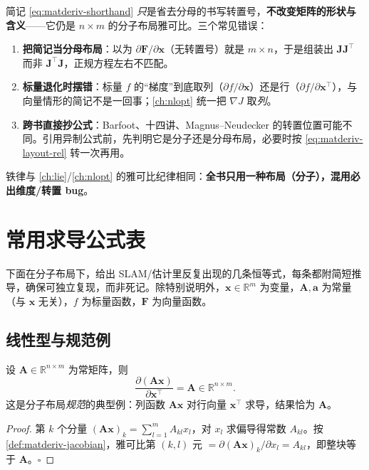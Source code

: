 \begin{pitfall}
简记 \cref{eq:matderiv-shorthand} \emph{只}是省去分母的书写转置号，\textbf{不改变矩阵的形状与含义}——它仍是 $n\times m$ 的分子布局雅可比。三个常见错误：
\begin{enumerate}
  \item \textbf{把简记当分母布局}：以为 $\partial\mathbf{F}/\partial\mathbf{x}$（无转置号）就是 $m\times n$，于是组装出 $\mathbf{J}\mathbf{J}^\top$ 而非 $\mathbf{J}^\top\mathbf{J}$，正规方程左右不匹配。
  \item \textbf{标量退化时摆错}：标量 $f$ 的“梯度”到底取列（$\partial f/\partial\mathbf{x}$）还是行（$\partial f/\partial\mathbf{x}^\top$），与向量情形的简记不是一回事；\cref{ch:nlopt} 统一把 $\nabla J$ 取\emph{列}。
  \item \textbf{跨书直接抄公式}：Barfoot、十四讲、Magnus--Neudecker 的转置位置可能不同。引用异制公式前，先判明它是分子还是分母布局，必要时按 \cref{eq:matderiv-layout-rel} 转一次再用。
\end{enumerate}
铁律与 \cref{ch:lie}/\cref{ch:nlopt} 的雅可比纪律相同：\textbf{全书只用一种布局（分子），混用必出维度/转置 bug}。
\end{pitfall}

\section{常用求导公式表}
\label{sec:matderiv-formulas}

下面在分子布局下，给出 SLAM/估计里反复出现的几条恒等式，每条都附简短推导，确保可独立复现，而非死记。除特别说明外，$\mathbf{x}\in\mathbb{R}^m$ 为变量，$\mathbf{A},\mathbf{a}$ 为常量（与 $\mathbf{x}$ 无关），$f$ 为标量函数，$\mathbf{F}$ 为向量函数。

\subsection{线性型与规范例}
\label{sec:matderiv-linear}

\begin{proposition}\label{prop:matderiv-Ax}
设 $\mathbf{A}\in\mathbb{R}^{n\times m}$ 为常矩阵，则
\begin{equation}
  \frac{\partial(\mathbf{A}\mathbf{x})}{\partial\mathbf{x}^\top}=\mathbf{A}\in\mathbb{R}^{n\times m}.
  \label{eq:matderiv-Ax}
\end{equation}
这是分子布局\emph{规范}的典型例：列函数 $\mathbf{A}\mathbf{x}$ 对行向量 $\mathbf{x}^\top$ 求导，结果恰为 $\mathbf{A}$。
\end{proposition}
\begin{proof}
第 $k$ 个分量 $(\mathbf{A}\mathbf{x})_k=\sum_{l=1}^{m}A_{kl}x_l$，对 $x_l$ 求偏导得常数 $A_{kl}$。按 \cref{def:matderiv-jacobian}，雅可比第 $(k,l)$ 元 $=\partial(\mathbf{A}\mathbf{x})_k/\partial x_l=A_{kl}$，即整块等于 $\mathbf{A}$。\hfill$\square$
\end{proof}

